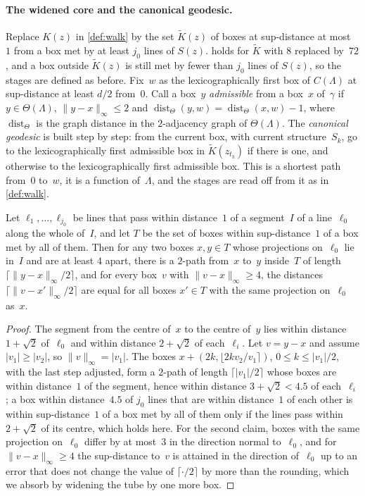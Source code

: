\documentclass[11pt,letterpaper]{article}
\DeclareMathOperator{\dist}{dist}
\begin{document}
\paragraph{The widened core and the canonical geodesic.} Replace $K(z)$ in \cref{def:walk} by the set $\widetilde K(z)$ of boxes at sup-distance at most~$1$ from a box met by at least $j_0$ lines of $S(z)$.  holds for $\widetilde K$ with $8$ replaced by~$72$, and a box outside $\widetilde K(z)$ is still met by fewer than $j_0$ lines of $S(z)$, so the stages are defined as before. Fix~$w$ as the lexicographically first box of $C(\Lambda)$ at sup-distance at least $d/2$ from~$0$. Call a box~$y$ \emph{admissible} from a box~$x$ of~$\gamma$ if $y\in\Theta(\Lambda)$, $\lVert y-x\rVert_\infty\le2$ and $\dist_\Theta(y,w)=\dist_\Theta(x,w)-1$, where $\dist_\Theta$ is the graph distance in the $2$-adjacency graph of $\Theta(\Lambda)$. The \emph{canonical geodesic} is built step by step: from the current box, with current structure~$S_k$, go to the lexicographically first admissible box in $\widetilde K(z_{t_k})$ if there is one, and otherwise to the lexicographically first admissible box. This is a shortest path from~$0$ to~$w$, it is a function of~$\Lambda$, and the stages are read off from it as in \cref{def:walk}.

\begin{lemma}[Tubes]
\label{lem:tube}
Let $\ell_1,\dots,\ell_{j_0}$ be lines that pass within distance~$1$ of a segment~$I$ of a line~$\ell_0$ along the whole of~$I$, and let $T$ be the set of boxes within sup-distance~$1$ of a box met by all of them. Then for any two boxes $x,y\in T$ whose projections on~$\ell_0$ lie in~$I$ and are at least $4$ apart, there is a $2$-path from~$x$ to~$y$ inside~$T$ of length $\lceil\lVert y-x\rVert_\infty/2\rceil$, and for every box~$v$ with $\lVert v-x\rVert_\infty\ge4$, the distances $\lceil\lVert v-x'\rVert_\infty/2\rceil$ are equal for all boxes $x'\in T$ with the same projection on~$\ell_0$ as~$x$.
\end{lemma}

\begin{proof}
The segment from the centre of~$x$ to the centre of~$y$ lies within distance $1+\sqrt2$ of~$\ell_0$ and within distance $2+\sqrt2$ of each~$\ell_i$. Let $v=y-x$ and assume $\lvert v_1\rvert\ge\lvert v_2\rvert$, so $\lVert v\rVert_\infty=\lvert v_1\rvert$. The boxes $x+(2k,\lfloor2kv_2/v_1\rceil)$, $0\le k\le\lvert v_1\rvert/2$, with the last step adjusted, form a $2$-path of length $\lceil\lvert v_1\rvert/2\rceil$ whose boxes are within distance~$1$ of the segment, hence within distance $3+\sqrt2<4.5$ of each~$\ell_i$; a box within distance~$4.5$ of $j_0$ lines that are within distance~$1$ of each other is within sup-distance~$1$ of a box met by all of them only if the lines pass within $2+\sqrt2$ of its centre, which holds here. For the second claim, boxes with the same projection on~$\ell_0$ differ by at most~$3$ in the direction normal to~$\ell_0$, and for $\lVert v-x\rVert_\infty\ge4$ the sup-distance to~$v$ is attained in the direction of~$\ell_0$ up to an error that does not change the value of $\lceil\cdot/2\rceil$ by more than the rounding, which we absorb by widening the tube by one more box.
\end{proof}
\end{document}
